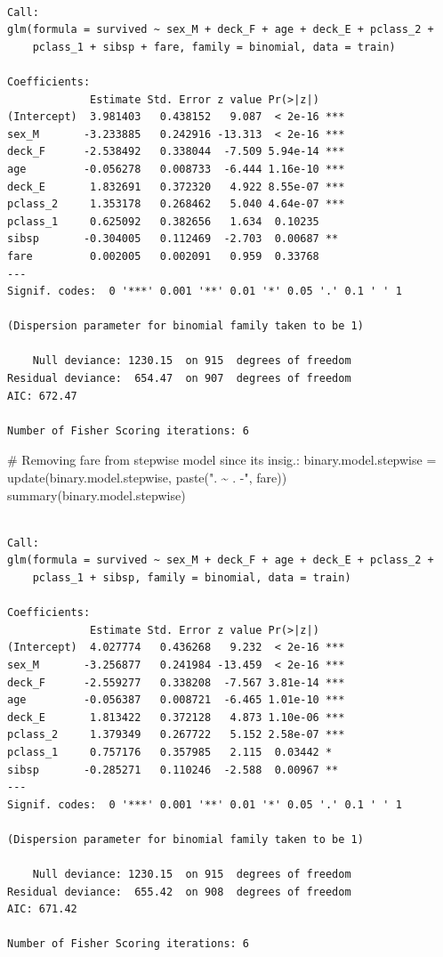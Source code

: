 \documentclass[
  letterpaper,
  DIV=11,
  numbers=noendperiod]{scrartcl}
\newenvironment{Shaded}{\begin{snugshade}}{\end{snugshade}}
\newcommand{\CommentTok}[1]{\textcolor[rgb]{0.37,0.37,0.37}{#1}}
\newcommand{\FunctionTok}[1]{\textcolor[rgb]{0.28,0.35,0.67}{#1}}
\newcommand{\NormalTok}[1]{\textcolor[rgb]{0.00,0.23,0.31}{#1}}
\newcommand{\OtherTok}[1]{\textcolor[rgb]{0.00,0.23,0.31}{#1}}
\newcommand{\StringTok}[1]{\textcolor[rgb]{0.13,0.47,0.30}{#1}}
\begin{document}
\begin{verbatim}

Call:
glm(formula = survived ~ sex_M + deck_F + age + deck_E + pclass_2 + 
    pclass_1 + sibsp + fare, family = binomial, data = train)

Coefficients:
             Estimate Std. Error z value Pr(>|z|)    
(Intercept)  3.981403   0.438152   9.087  < 2e-16 ***
sex_M       -3.233885   0.242916 -13.313  < 2e-16 ***
deck_F      -2.538492   0.338044  -7.509 5.94e-14 ***
age         -0.056278   0.008733  -6.444 1.16e-10 ***
deck_E       1.832691   0.372320   4.922 8.55e-07 ***
pclass_2     1.353178   0.268462   5.040 4.64e-07 ***
pclass_1     0.625092   0.382656   1.634  0.10235    
sibsp       -0.304005   0.112469  -2.703  0.00687 ** 
fare         0.002005   0.002091   0.959  0.33768    
---
Signif. codes:  0 '***' 0.001 '**' 0.01 '*' 0.05 '.' 0.1 ' ' 1

(Dispersion parameter for binomial family taken to be 1)

    Null deviance: 1230.15  on 915  degrees of freedom
Residual deviance:  654.47  on 907  degrees of freedom
AIC: 672.47

Number of Fisher Scoring iterations: 6
\end{verbatim}

\begin{Shaded}
\begin{Highlighting}[]
\CommentTok{\# Removing fare from stepwise model since its insig.:}
\NormalTok{binary.model.stepwise }\OtherTok{=} \FunctionTok{update}\NormalTok{(binary.model.stepwise, }\FunctionTok{paste}\NormalTok{(}\StringTok{". \textasciitilde{} . {-}"}\NormalTok{, }\StringTok{\textquotesingle{}fare\textquotesingle{}}\NormalTok{))}
\FunctionTok{summary}\NormalTok{(binary.model.stepwise)}
\end{Highlighting}
\end{Shaded}

\begin{verbatim}

Call:
glm(formula = survived ~ sex_M + deck_F + age + deck_E + pclass_2 + 
    pclass_1 + sibsp, family = binomial, data = train)

Coefficients:
             Estimate Std. Error z value Pr(>|z|)    
(Intercept)  4.027774   0.436268   9.232  < 2e-16 ***
sex_M       -3.256877   0.241984 -13.459  < 2e-16 ***
deck_F      -2.559277   0.338208  -7.567 3.81e-14 ***
age         -0.056387   0.008721  -6.465 1.01e-10 ***
deck_E       1.813422   0.372128   4.873 1.10e-06 ***
pclass_2     1.379349   0.267722   5.152 2.58e-07 ***
pclass_1     0.757176   0.357985   2.115  0.03442 *  
sibsp       -0.285271   0.110246  -2.588  0.00967 ** 
---
Signif. codes:  0 '***' 0.001 '**' 0.01 '*' 0.05 '.' 0.1 ' ' 1

(Dispersion parameter for binomial family taken to be 1)

    Null deviance: 1230.15  on 915  degrees of freedom
Residual deviance:  655.42  on 908  degrees of freedom
AIC: 671.42

Number of Fisher Scoring iterations: 6
\end{verbatim}
\end{document}
